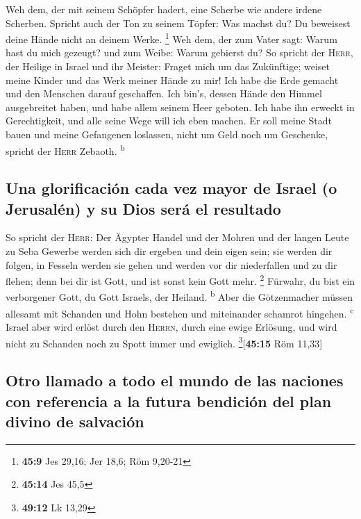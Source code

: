  Weh dem, der mit seinem Schöpfer hadert, eine Scherbe wie
andere irdene Scherben. Spricht auch der Ton zu seinem Töpfer: Was
machst du? Du beweisest deine Hände nicht an deinem Werke. \footnote{\textbf{45:9}
  Jes 29,16; Jer 18,6; Röm 9,20-21}  Weh dem, der zum
Vater sagt: Warum hast du mich gezeugt? und zum Weibe: Warum gebierst
du?  So spricht der \textsc{Herr}, der Heilige in Israel
und ihr Meister: Fraget mich um das Zukünftige; weiset meine Kinder und
das Werk meiner Hände zu mir!  Ich habe die Erde gemacht
und den Menschen darauf geschaffen. Ich bin's, dessen Hände den Himmel
ausgebreitet haben, und habe allem seinem Heer geboten. 
Ich habe ihn erweckt in Gerechtigkeit, und alle seine Wege will ich eben
machen. Er soll meine Stadt bauen und meine Gefangenen loslassen, nicht
um Geld noch um Geschenke, spricht der \textsc{Herr} Zebaoth.
\textsuperscript{b}

\hypertarget{una-glorificaciuxf3n-cada-vez-mayor-de-israel-o-jerusaluxe9n-y-su-dios-seruxe1-el-resultado}{%
\subsection{Una glorificación cada vez mayor de Israel (o Jerusalén) y
su Dios será el
resultado}\label{una-glorificaciuxf3n-cada-vez-mayor-de-israel-o-jerusaluxe9n-y-su-dios-seruxe1-el-resultado}}

 So spricht der \textsc{Herr}: Der Ägypter Handel und der
Mohren und der langen Leute zu Seba Gewerbe werden sich dir ergeben und
dein eigen sein; sie werden dir folgen, in Fesseln werden sie gehen und
werden vor dir niederfallen und zu dir flehen; denn bei dir ist Gott,
und ist sonst kein Gott mehr. \footnote{\textbf{45:14} Jes 45,5}
 Fürwahr, du bist ein verborgener Gott, du Gott Israels,
der Heiland. \textsuperscript{b}  Aber die Götzenmacher
müssen allesamt mit Schanden und Hohn bestehen und miteinander schamrot
hingehen. \textsuperscript{c}  Israel aber wird erlöst
durch den \textsc{Herrn}, durch eine ewige Erlösung, und wird nicht zu
Schanden noch zu Spott immer und ewiglich. \footnote{\textbf{49:12} Lk
  13,29}{[}\textbf{45:15} Röm 11,33{]}

\hypertarget{otro-llamado-a-todo-el-mundo-de-las-naciones-con-referencia-a-la-futura-bendiciuxf3n-del-plan-divino-de-salvaciuxf3n}{%
\subsection{Otro llamado a todo el mundo de las naciones con referencia
a la futura bendición del plan divino de
salvación}\label{otro-llamado-a-todo-el-mundo-de-las-naciones-con-referencia-a-la-futura-bendiciuxf3n-del-plan-divino-de-salvaciuxf3n}}

